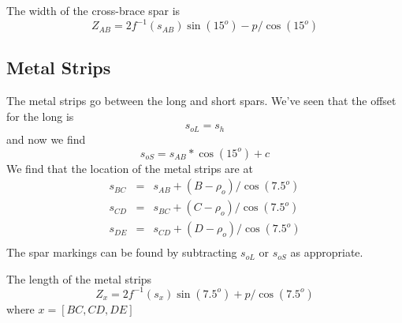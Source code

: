 \documentclass{article}
\begin{document}
The width of the cross-brace spar is
\begin{equation}
Z_{AB} = 2f^{-1}(s_{AB})\sin(15^o) - p/\cos(15^o)
\end{equation}

\subsection{Metal Strips}
The metal strips go between the long and short spars.  We've seen that the offset for the long is
\begin{equation}
s_{oL} = s_h
\end{equation}
and now we find
\begin{equation}
s_{oS} = s_{AB}*\cos(15^o) + c
\end{equation}
We find that the location of the metal strips are at
\begin{eqnarray}
s_{BC} & = & s_{AB} + (B - \rho_o)/\cos(7.5^o) \\
s_{CD} & = & s_{BC} + (C - \rho_o)/\cos(7.5^o) \\
s_{DE} & = & s_{CD} + (D - \rho_o)/\cos(7.5^o) \\
\end{eqnarray}
The spar markings can be found by subtracting $s_{oL}$ or $s_{oS}$ as appropriate.

The length of the metal strips
\begin{equation}
Z_{x} = 2f^{-1}(s_{x})\sin(7.5^o) + p/\cos(7.5^o)
\end{equation}
where $x = [BC,CD,DE]$
\end{document}
